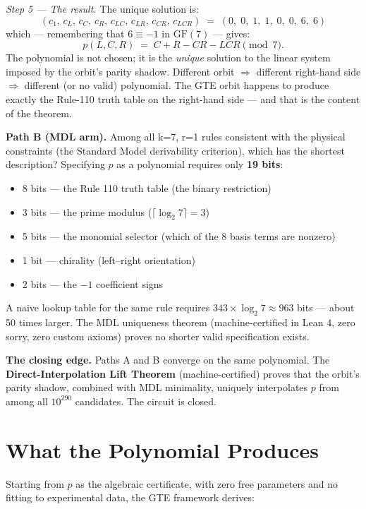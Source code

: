\documentclass[11pt,a4paper]{article}
\newcommand{\term}[1]{\textbf{#1}}
\begin{document}
\medskip
\noindent\textit{Step 5 — The result.}
The unique solution is:
\[
  (c_1,\, c_L,\, c_C,\, c_R,\, c_{LC},\, c_{LR},\, c_{CR},\, c_{LCR})
  \;=\; (0,\; 0,\; 1,\; 1,\; 0,\; 0,\; 6,\; 6)
\]
which — remembering that $6 \equiv -1$ in $\mathrm{GF}(7)$ — gives:
\[
  p(L,C,R) \;=\; C + R - CR - LCR \pmod{7}.
\]
The polynomial is not chosen; it is the \emph{unique} solution to the linear
system imposed by the orbit's parity shadow.  Different orbit $\Rightarrow$
different right-hand side $\Rightarrow$ different (or no valid) polynomial.
The GTE orbit happens to produce exactly the Rule-110 truth table on the
right-hand side — and that is the content of the theorem.

\textbf{Path B (MDL arm).}
Among all k=7, r=1 rules consistent with the physical constraints (the
Standard Model derivability criterion), which has the shortest description?
Specifying $p$ as a polynomial requires only \textbf{19 bits}:
\begin{itemize}
  \item 8 bits — the Rule 110 truth table (the binary restriction)
  \item 3 bits — the prime modulus ($\lceil\log_2 7\rceil = 3$)
  \item 5 bits — the monomial selector (which of the 8 basis terms are
    nonzero)
  \item 1 bit — chirality (left--right orientation)
  \item 2 bits — the $-1$ coefficient signs
\end{itemize}
A naive lookup table for the same rule requires $343 \times \log_2 7 \approx
963$ bits — about 50 times larger.  The MDL uniqueness theorem (machine-certified
in Lean 4, zero sorry, zero custom axioms) proves no shorter valid
specification exists.

\textbf{The closing edge.}
Paths A and B converge on the same polynomial.  The
\term{Direct-Interpolation Lift Theorem} (machine-certified) proves that the
orbit's parity shadow, combined with MDL minimality, uniquely interpolates
$p$ from among all $10^{290}$ candidates.  The circuit is closed.

\section{What the Polynomial Produces}

Starting from $p$ as the algebraic certificate, with zero free parameters and
no fitting to experimental data, the GTE framework derives:
\end{document}
